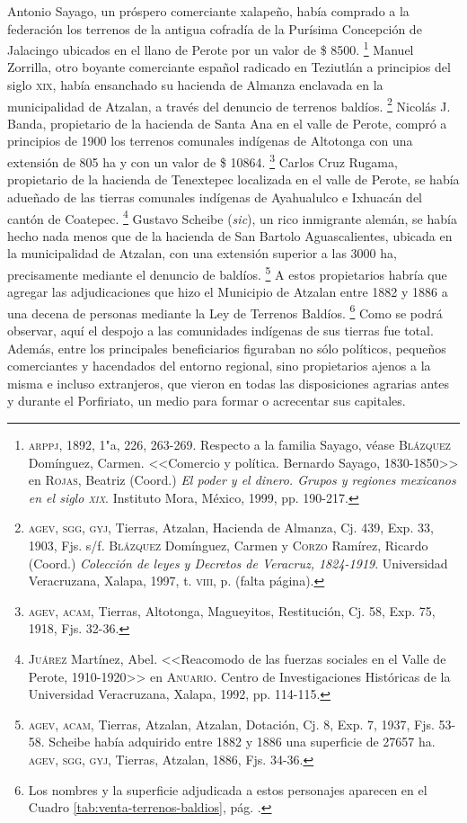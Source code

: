 \documentclass[14pt,twoside,final]{extbook} %
\let\oldfootnote\footnote
\renewcommand\footnote[1]{%
\oldfootnote{\hspace{1mm}#1}}
\begin{document}
Antonio Sayago, un próspero comerciante xalapeño, había comprado a la federación los terrenos de la antigua cofradía de la Purísima Concepción de Jalacingo ubicados en el llano de Perote por un valor de \$ 8500.\footnote{\textsc{arppj}, 1892, 1"a, 226, 263-269. Respecto a la familia Sayago, véase \textsc{Blázquez} Domínguez, Carmen. <<Comercio y política. Bernardo Sayago, 1830-1850>> en \textsc{Rojas}, Beatriz (Coord.) \emph{El poder y el dinero. Grupos y regiones mexicanos en el siglo \textsc{xix}}. Instituto Mora, México, 1999, pp. 190-217.} Manuel Zorrilla, otro
boyante comerciante español radicado en Teziutlán a principios del siglo \textsc{xix}, había ensanchado su hacienda de Almanza enclavada en la municipalidad de Atzalan, a través del denuncio de terrenos baldíos.\footnote{\textsc{agev, sgg, gyj}, Tierras, Atzalan, Hacienda de Almanza, Cj. 439, Exp. 33, 1903, Fjs. s/f. \textsc{Blázquez} Domínguez, Carmen y \textsc{Corzo} Ramírez, Ricardo (Coord.) \emph{Colección de leyes y Decretos de Veracruz, 1824-1919}. Universidad Veracruzana, Xalapa, 1997, t. \textsc{viii}, p. (falta página).} Nicolás J. Banda, propietario de la hacienda de Santa Ana en el valle de Perote, compró a principios de 1900 los terrenos comunales indígenas de Altotonga con una extensión de 805 ha y con un valor de \$ 10864.\footnote{\textsc{agev, acam}, Tierras, Altotonga, Magueyitos, Restitución, Cj. 58, Exp. 75, 1918, Fjs. 32-36.} Carlos Cruz Rugama, propietario de la hacienda de Tenextepec localizada en el valle de Perote, se había adueñado de las tierras comunales indígenas de Ayahualulco e Ixhuacán del cantón de Coatepec.\footnote{\textsc{Juárez} Martínez, Abel. <<Reacomodo de las fuerzas sociales en el Valle de Perote, 1910-1920>> en \textsc{Anuario}. Centro de Investigaciones Históricas de la Universidad Veracruzana, Xalapa, 1992, pp. 114-115.} Gustavo Scheibe (\emph{sic}), un rico inmigrante alemán, se había hecho nada menos que de la hacienda de San Bartolo Aguascalientes, ubicada en la municipalidad de Atzalan, con una extensión superior a las 3000 ha, precisamente mediante el denuncio de baldíos.\footnote{\textsc{agev, acam}, Tierras, Atzalan, Atzalan, Dotación, Cj. 8, Exp. 7, 1937, Fjs. 53-58. Scheibe había adquirido entre 1882 y 1886 una superficie de 27657 ha. \textsc{agev, sgg, gyj}, Tierras, Atzalan, 1886, Fjs. 34-36.} A estos propietarios habría que agregar las adjudicaciones que hizo el Municipio de Atzalan entre 1882 y 1886 a una decena de personas mediante la Ley de Terrenos Baldíos.\footnote{Los nombres y la superficie adjudicada a estos personajes aparecen en el Cuadro  \ref{tab:venta-terrenos-baldios}, pág. \pageref{tab:venta-terrenos-baldios}.} Como se podrá observar, aquí el despojo a las comunidades indígenas de sus tierras fue total. Además, entre los principales beneficiarios figuraban no sólo políticos, pequeños comerciantes y hacendados del entorno regional, sino propietarios ajenos a la misma e incluso extranjeros, que vieron en todas las disposiciones agrarias antes y durante el Porfiriato, un medio para formar o acrecentar sus capitales.
\end{document}
